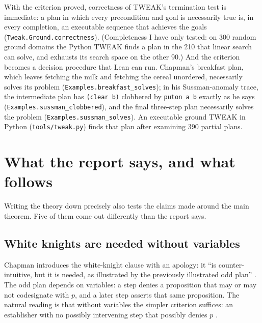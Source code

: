 \documentclass[11pt]{article}
\newcommand{\lean}[1]{\texttt{#1}}
\newcommand{\code}[1]{\texttt{#1}}
\begin{document}
With the criterion proved, correctness of TWEAK's termination test is
immediate: a plan in which every precondition and goal is necessarily true
is, in every completion, an executable sequence that achieves the goals
(\lean{Tweak.Ground.correctness}). (Completeness I have only tested: on
300 random ground domains the Python TWEAK finds a plan in the 210 that
linear search can solve, and exhausts its search space on the other 90.) And the criterion becomes a decision
procedure that Lean can run. Chapman's breakfast plan, which leaves
fetching the milk and fetching the cereal unordered, necessarily solves its
problem (\lean{Examples.breakfast\_solves}); in his Sussman-anomaly trace,
the intermediate plan has \code{(clear b)} clobbered by \code{puton a b}
exactly as he says (\lean{Examples.sussman\_clobbered}), and the final
three-step plan necessarily solves the problem
(\lean{Examples.sussman\_solves}). An executable ground TWEAK in Python
(\code{tools/tweak.py}) finds that plan after examining 390 partial plans.

\section{What the report says, and what follows}
\label{sec:claims}

Writing the theory down precisely also tests the claims made around the
main theorem. Five of them come out differently than the report says.

\subsection{White knights are needed without variables}

Chapman introduces the white-knight clause with an apology: it ``is
counter-intuitive, but it is needed, as illustrated by the previously
illustrated odd plan'' \citep[p.~9]{chapman1985}. The odd plan depends on
variables: a step denies a proposition that may or may not codesignate
with $p$, and a later step asserts that same proposition. The natural
reading is that without variables the simpler criterion suffices: an
establisher with no possibly intervening step that possibly denies $p$
\citep[p.~8]{chapman1985}.
\end{document}
